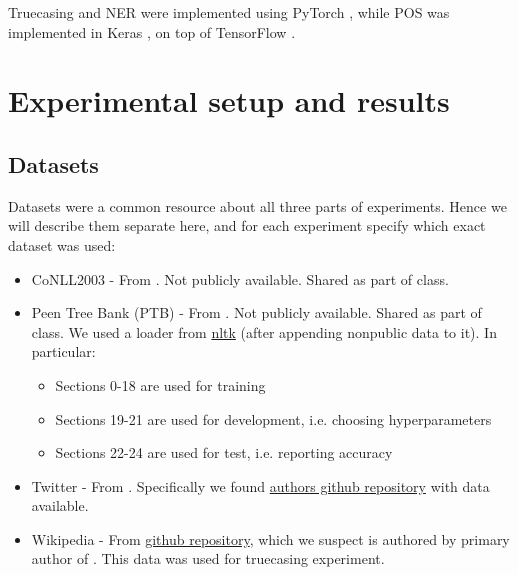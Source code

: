 \documentclass[11pt,a4paper]{article}
\begin{document}
Truecasing and NER were implemented using PyTorch \cite{pytorch}, while POS was implemented in Keras \cite{keras}, on top of TensorFlow \cite{tensorflow2015-whitepaper}.

\section{Experimental setup and results}

\subsection{Datasets}
\label{sec:datasets}
Datasets were a common resource about all three parts of experiments. Hence we will describe them separate here, and for each experiment specify which exact dataset was used:
\begin{itemize}
    \item CoNLL2003 - From \cite{conll2003}. Not publicly available. Shared as part of class.
    \item Peen Tree Bank (PTB) - From \cite{penn-treebank}. Not publicly available. Shared as part of class. We used a loader from \href{https://www.nltk.org/}{nltk} (after appending nonpublic data to it). In particular:
        \begin{itemize}
            \item Sections 0-18 are used for training
            \item Sections 19-21 are used for development, i.e. choosing hyperparameters
            \item Sections 22-24 are used for test, i.e. reporting accuracy
        \end{itemize}
    \item Twitter - From \cite{twitter-dataset}. Specifically we found \href{https://github.com/GateNLP/broad_twitter_corpus}{authors github repository} with data available.
    \item Wikipedia - From \href{https://github.com/raymondhs/char-rnn-truecase/tree/master/data/wiki}{github repository}, which we suspect is authored by primary author of \cite{susanto-etal-2016-learning}. This data was used for truecasing experiment.
\end{itemize}
\end{document}
